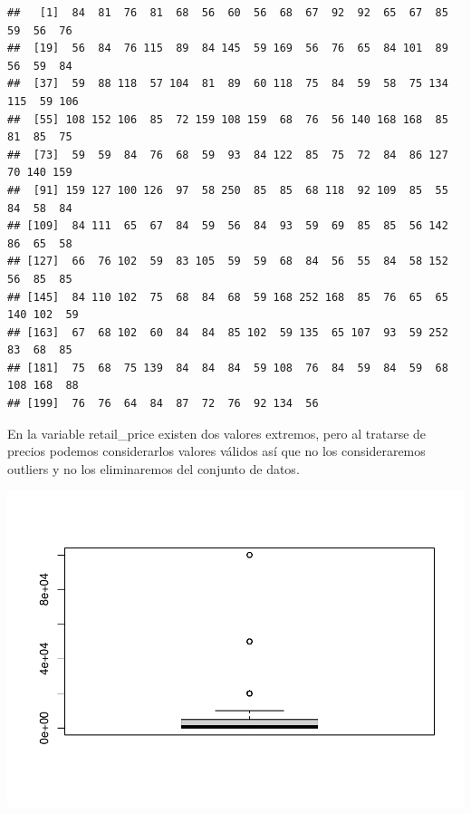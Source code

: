 \documentclass[
]{article}
\newenvironment{Shaded}{\begin{snugshade}}{\end{snugshade}}
\newcommand{\KeywordTok}[1]{\textcolor[rgb]{0.13,0.29,0.53}{\textbf{#1}}}
\newcommand{\NormalTok}[1]{#1}
\newcommand{\OperatorTok}[1]{\textcolor[rgb]{0.81,0.36,0.00}{\textbf{#1}}}
\begin{document}
\begin{Shaded}
\end{Shaded}

\begin{verbatim}
##   [1]  84  81  76  81  68  56  60  56  68  67  92  92  65  67  85  59  56  76
##  [19]  56  84  76 115  89  84 145  59 169  56  76  65  84 101  89  56  59  84
##  [37]  59  88 118  57 104  81  89  60 118  75  84  59  58  75 134 115  59 106
##  [55] 108 152 106  85  72 159 108 159  68  76  56 140 168 168  85  81  85  75
##  [73]  59  59  84  76  68  59  93  84 122  85  75  72  84  86 127  70 140 159
##  [91] 159 127 100 126  97  58 250  85  85  68 118  92 109  85  55  84  58  84
## [109]  84 111  65  67  84  59  56  84  93  59  69  85  85  56 142  86  65  58
## [127]  66  76 102  59  83 105  59  59  68  84  56  55  84  58 152  56  85  85
## [145]  84 110 102  75  68  84  68  59 168 252 168  85  76  65  65 140 102  59
## [163]  67  68 102  60  84  84  85 102  59 135  65 107  93  59 252  83  68  85
## [181]  75  68  75 139  84  84  84  59 108  76  84  59  84  59  68 108 168  88
## [199]  76  76  64  84  87  72  76  92 134  56
\end{verbatim}

En la variable retail\_price existen dos valores extremos, pero al
tratarse de precios podemos considerarlos valores válidos así que no los
consideraremos outliers y no los eliminaremos del conjunto de datos.

\begin{Shaded}
\end{Shaded}

\includegraphics{PRAC2_Limpieza_Analisis_Datos---Sales_files/figure-latex/unnamed-chunk-18-1.pdf}
\end{document}
